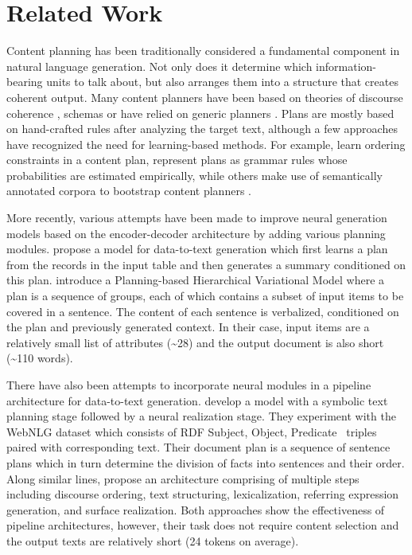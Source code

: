 \documentclass[11pt,a4paper]{article}
\begin{document}
\section{Related Work}
\label{sec:related-work}


Content planning has been traditionally considered a fundamental
component in natural language generation. Not only does it determine
which information-bearing units to talk about, but also arranges them
into a structure that creates coherent output. Many content planners
have been based on theories of discourse coherence
\cite{hovy1993automated}, schemas \cite{mckeown-etal-1997-language} or
have relied on generic planners \cite{dale1989generating}.  Plans are
mostly based on hand-crafted rules after analyzing the target text,
although a few approaches have recognized the need for learning-based
methods. For example, \citet{duboue-mckeown-2001-empirically} learn
ordering constraints in a content plan,
\citet{konstas-lapata-2013-inducing} represent plans as grammar rules
whose probabilities are estimated empirically, while others make use
of semantically annotated corpora to bootstrap content planners
\cite{duboue-mckeown-2002-content,kan-mckeown-2002-corpus}.




More recently, various attempts have been made to improve neural
generation models \cite{wiseman-etal-2017-challenges} based on the
encoder-decoder architecture \cite{DBLP:journals/corr/BahdanauCB14} by
adding various planning
modules. \citet{DBLP:journals/corr/abs-1809-00582} propose a model for
data-to-text generation which first learns a plan from the
records in the input table and then generates a summary conditioned on
this plan. \citet{shao-etal-2019-long} introduce a Planning-based
Hierarchical Variational Model where a plan is a sequence of groups,
each of which contains a subset of input items to be covered in a
sentence. The content of each sentence is verbalized, conditioned on
the plan and previously generated context. In their case, input items
are a relatively small list of attributes (\textasciitilde 28) and the
output document is also short (\textasciitilde 110 words).

There have also been attempts to incorporate neural modules in a
pipeline architecture for data-to-text generation.
\citet{moryossef-etal-2019-step} develop a model with a symbolic text
planning stage followed by a neural realization stage.  They
experiment with the WebNLG dataset \cite{gardent-etal-2017-creating}
which consists of RDF  Subject, Object, Predicate~
triples paired with corresponding text.  Their document plan is a
sequence of sentence plans which in turn determine the division of
facts into sentences and their order.
Along similar lines, \citet{castro-ferreira-etal-2019-neural} propose an
architecture comprising of multiple steps including discourse ordering,
text structuring, lexicalization,
referring expression generation, and surface realization. Both approaches show the effectiveness of pipeline architectures,
however, their task does not require content selection and the output
texts are relatively short (24 tokens on average).
\end{document}
